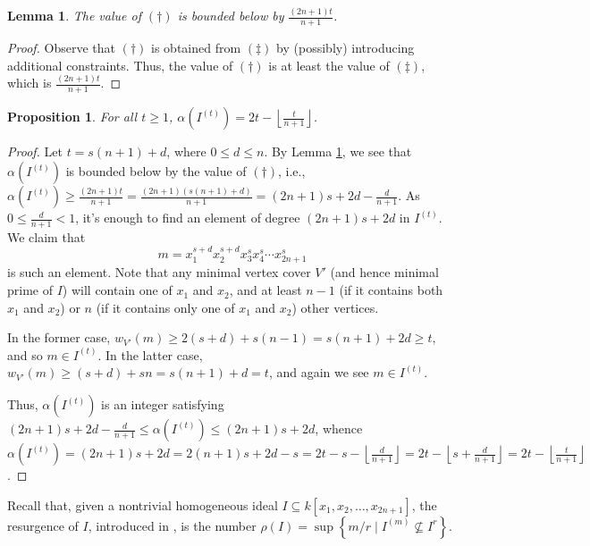 \documentclass[12pt]{amsart}
\def\setof#1#2{{\left\{#1 \mid #2\right\}}}
\renewcommand{\geq}{\geqslant}
\renewcommand{\ge}{\geqslant}
\renewcommand{\leq}{\leqslant}
\theoremstyle{plain}
\newtheorem{proposition}[theorem]{Proposition}
\newtheorem{lem}[theorem]{Lemma}
\theoremstyle{definition}
\begin{document}
\begin{lem}\label{lem:alphalowerbound}
	The value of $(\dagger)$ is bounded below by $\frac{(2n+1)t}{n+1}$.
\end{lem}

\begin{proof}
	Observe that $(\dagger)$ is obtained from $(\ddagger)$ by (possibly) introducing additional constraints.
	Thus, the value of $(\dagger)$ is at least the value of $(\ddagger)$, which is $\frac{(2n+1)t}{n+1}$.
\end{proof}





\begin{proposition}\label{prop:alphas}
	For all $t\ge 1$, $\alpha(I^{(t)}) = 2t - \left\lfloor \frac{t}{n+1}\right\rfloor$.
\end{proposition}

\begin{proof}
	Let $t = s(n+1)+d$, where $0\leq d\leq n$.
	By Lemma \ref{lem:alphalowerbound}, we see that $\alpha(I^{(t)})$ is bounded below by the value of $(\dagger)$, i.e., $\alpha(I^{(t)}) \geq \frac{(2n+1)t}{n+1} = \frac{(2n+1)(s(n+1)+d)}{n+1} = (2n+1)s + 2d - \frac{d}{n+1}$.	
	As $0 \leq \frac{d}{n+1} < 1$, it's enough to find an element of degree $(2n+1)s+2d$ in $I^{(t)}$.
	We claim that 
	\[
		m = x_1^{s+d} x_2^{s+d} x_3^s x_4^s \cdots x_{2n+1}^s
	\] 
	is such an element.
	Note that any minimal vertex cover $V'$ (and hence minimal prime of $I$) will contain one of $x_1$ and $x_2$, and at least $n-1$ (if it contains both $x_1$ and $x_2$) or $n$ (if it contains only one of $x_1$ and $x_2$) other vertices.
	
	In the former case, $w_{V'}(m) \ge 2(s+d) + s(n-1) = s(n+1) + 2d \geq t$, and so $m \in I^{(t)}$.
	In the latter case, $w_{V'}(m) \ge (s+d) + sn = s(n+1) + d = t$, and again we see $m\in I^{(t)}$.
	
	Thus, $\alpha(I^{(t)})$ is an integer satisfying $(2n+1)s + 2d - \frac{d}{n+1} \leq \alpha(I^{(t)}) \leq (2n+1)s + 2d$, whence $\alpha(I^{(t)}) = (2n+1)s + 2d = 2(n+1)s+2d-s = 2t-s - \left\lfloor \frac{d}{n+1}\right\rfloor = 2t - \left\lfloor s+\frac{d}{n+1}\right\rfloor = 2t - \left\lfloor \frac{t}{n+1}\right\rfloor$.
\end{proof}


Recall that, given a nontrivial homogeneous ideal $I\subseteq k[x_1,x_2,\ldots,x_{2n+1}]$, the resurgence of $I$, introduced in \cite{2010:bocciharbourne}, is the number $\rho(I) = \sup \setof{m/r}{I^{(m)}\not\subseteq I^r}$.
\end{document}
